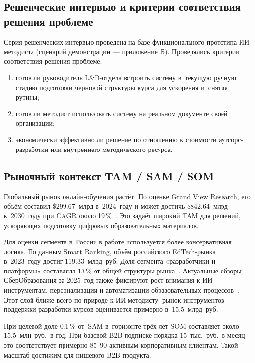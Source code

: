\subsection[Решенческие интервью и критерии решения]{Решенческие интервью и критерии соответствия решения проблеме}

Серия решенческих интервью проведена на базе функционального прототипа ИИ-методиста
(сценарий демонстрации — приложение~Б). Проверялись критерии
соответствия решения проблеме.

\begin{enumerate}
  \item готов ли руководитель L\&D-отдела встроить систему
    в~текущую ручную стадию подготовки черновой структуры курса
    для ускорения и~снятия рутины;
  \item готов ли методист использовать систему на реальном документе
    своей организации;
  \item экономически эффективно ли решение по отношению к
    стоимости аутсорс-разработки или внутреннего
    методического ресурса.
\end{enumerate}

\subsection{Рыночный контекст TAM / SAM / SOM}

Глобальный рынок онлайн-обучения растёт. По оценке Grand View Research,
его объём составил
\$299{.}67~млрд в~2024~году и может достичь \$842{.}64~млрд к~2030~году
при CAGR около 19\,\%~\cite{grandview_elearning_2025}. Это задаёт
широкий TAM для решений, ускоряющих подготовку цифровых
образовательных материалов.

Для оценки сегмента в~России в работе используется
более консервативная логика. По данным Smart Ranking, объём
российского EdTech-рынка в~2023~году достиг 119{.}33~млрд~руб.
Доля сегмента «разработчики и платформы» составляла 13\,\%
от общей структуры рынка~\cite{smart_ranking_elearning_2024}.
Актуальные обзоры СберОбразования за 2025~год также фиксируют
рост внимания к ИИ-инструментам, персонализации и автоматизации
образовательных процессов~\cite{sber_education_trends_q2_2025,sber_education_trends_q3_2025}.
Этот слой ближе всего по природе
к ИИ-методисту; рынок инструментов поддержки
разработки курсов оценивается примерно в~15{.}5~млрд~руб.

При целевой доле 0{.}1\,\% от~SAM в~горизонте трёх лет
SOM составляет около 15{.}5~млн~руб.\ в год. При базовой B2B-подписке порядка
15~тыс.\ руб.\ в месяц это соответствует примерно
85–90 активным корпоративным клиентам. Такой масштаб достижим
для нишевого B2B-продукта.

